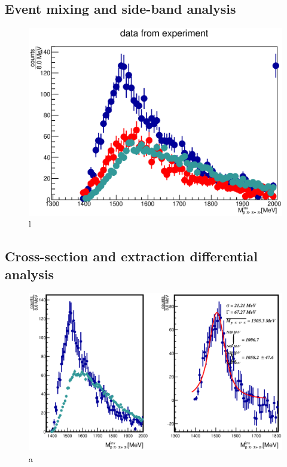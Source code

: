 \subsection{Event mixing and side-band analysis}

\begin{figure}[ht]
  \centering
  \includegraphics[width=0.9 \linewidth]{Data_Nb/canvas_cSB_EM_comparison.eps}
  \caption{l}
  \label{fig:CB_EM}
\end{figure}

\subsection{Cross-section and extraction differential analysis}
\begin{figure}[ht]
  \centering
  \includegraphics[width=0.9 \linewidth]{Chapter_analysisPNb/L1520.eps}
  \caption{a}
  \label{fig:L1520_pNb}
\end{figure}

